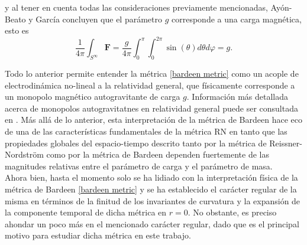 \documentclass[16pt,a4paper]{article}
\numberwithin{equation}{section}
\theoremstyle{definition}
\begin{document}
y al tener en cuenta todas las consideraciones previamente mencionadas, Ayón-Beato y García concluyen que el parámetro $g$ corresponde a una carga magnética, esto es 
\begin{equation}
\frac{1}{4 \pi} \int_{S^{\infty}}\mathbf{F} = \frac{g}{4 \pi} \int_{0}^{\pi}\int_{0}^{2\pi}\sin (\theta) d\theta d\varphi = g.
\end{equation}

Todo lo anterior permite entender la métrica \eqref{bardeen metric} como un acople de electrodinámica no-lineal a la relatividad general, que físicamente corresponde a un monopolo magnético autogravitante de carga $g$. Información más detallada acerca de monopolos autogravitatnes en relatividad general puede ser consultada en \cite{gibons2006,tchrakian2011}. Más allá de lo anterior, esta interpretación de la métrica de Bardeen hace eco de una de las características fundamentales de la métrica RN en tanto que las propiedades globales del espacio-tiempo descrito tanto por la métrica de Reissner-Nordström como por la métrica de Bardeen dependen fuertemente de las magnitudes relativas entre el parámetro de carga y el parámetro de masa.\\

Ahora bien, hasta el momento solo se ha lidiado con la interpretación física de la métrica de Bardeen \eqref{bardeen metric} y se ha establecido el carácter regular de la misma en términos de la finitud de los invariantes de curvatura y la expansión de la componente temporal de dicha métrica en $r = 0$. No obstante, es preciso ahondar un poco más en el mencionado carácter regular, dado que es el principal motivo para estudiar dicha métrica en este trabajo.\\
\end{document}
